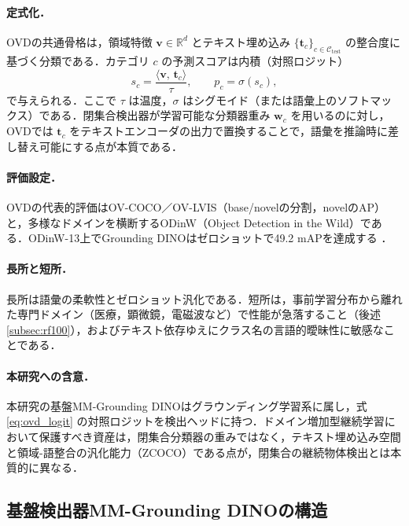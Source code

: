 \paragraph{定式化．}
OVDの共通骨格は，領域特徴 $\mathbf{v} \in \mathbb{R}^{d}$ とテキスト埋め込み $\{\mathbf{t}_{c}\}_{c \in \mathcal{C}_{\mathrm{test}}}$ の整合度に基づく分類である．カテゴリ $c$ の予測スコアは内積（対照ロジット）
\begin{equation}
s_{c} = \frac{\langle \mathbf{v},\, \mathbf{t}_{c}\rangle}{\tau},\qquad
p_{c} = \sigma\!\left(s_{c}\right),
\label{eq:ovd_logit}
\end{equation}
で与えられる．ここで $\tau$ は温度，$\sigma$ はシグモイド（または語彙上のソフトマックス）である．閉集合検出器が学習可能な分類器重み $\mathbf{w}_{c}$ を用いるのに対し，OVDでは $\mathbf{t}_{c}$ をテキストエンコーダの出力で置換することで，語彙を推論時に差し替え可能にする点が本質である．

\paragraph{評価設定．}
OVDの代表的評価はOV-COCO／OV-LVIS（base/novelの分割，novelのAP）と，多様なドメインを横断するODinW（Object Detection in the Wild）である．ODinW-13上でGrounding DINOはゼロショットで49.2 mAPを達成する \cite{rf100vl}．

\paragraph{長所と短所．}
長所は語彙の柔軟性とゼロショット汎化である．短所は，事前学習分布から離れた専門ドメイン（医療，顕微鏡，電磁波など）で性能が急落すること（後述 \ref{subsec:rf100}），およびテキスト依存ゆえにクラス名の言語的曖昧性に敏感なことである．

\paragraph{本研究への含意．}
本研究の基盤MM-Grounding DINOはグラウンディング学習系に属し，式 \eqref{eq:ovd_logit} の対照ロジットを検出ヘッドに持つ．ドメイン増加型継続学習において保護すべき資産は，閉集合分類器の重みではなく，テキスト埋め込み空間と領域-語整合の汎化能力（ZCOCO）である点が，閉集合の継続物体検出とは本質的に異なる．


\subsection{基盤検出器MM-Grounding DINOの構造}
\label{subsec:mmgdino}

